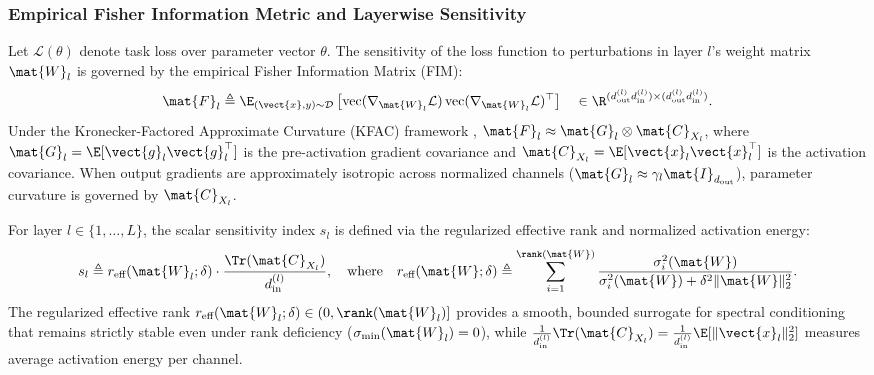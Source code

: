 \subsubsection{Empirical Fisher Information Metric and Layerwise Sensitivity}
Let $\mathcal{L}(\theta)$ denote task loss over parameter vector $\theta$. The sensitivity of the loss function to perturbations in layer $l$'s weight matrix $\mat{W}_l$ is governed by the empirical Fisher Information Matrix (FIM):
\begin{equation}
\mat{F}_l \triangleq \E_{(\vect{x}, y) \sim \mathcal{D}} \left[ \operatorname{vec}(\nabla_{\mat{W}_l} \mathcal{L}) \operatorname{vec}(\nabla_{\mat{W}_l} \mathcal{L})^\top \right] \quad \in \R^{(d_{\text{out}}^{(l)} d_{\text{in}}^{(l)}) \times (d_{\text{out}}^{(l)} d_{\text{in}}^{(l)})}.
\label{eq:fim_layerwise}
\end{equation}
Under the Kronecker-Factored Approximate Curvature (KFAC) framework \cite{martens2015optimizing}, $\mat{F}_l \approx \mat{G}_l \otimes \mat{C}_{X_l}$, where $\mat{G}_l = \E[\vect{g}_l \vect{g}_l^\top]$ is the pre-activation gradient covariance and $\mat{C}_{X_l} = \E[\vect{x}_l \vect{x}_l^\top]$ is the activation covariance. When output gradients are approximately isotropic across normalized channels ($\mat{G}_l \approx \gamma_l \mat{I}_{d_{\text{out}}}$), parameter curvature is governed by $\mat{C}_{X_l}$.

\begin{definition}
\label{def:layerwise_sensitivity}
For layer $l \in \{1, \dots, L\}$, the scalar sensitivity index $s_l$ is defined via the regularized effective rank and normalized activation energy:
\begin{equation}
s_l \triangleq r_{\text{eff}}(\mat{W}_l; \delta) \cdot \frac{\Tr(\mat{C}_{X_l})}{d_{\text{in}}^{(l)}}, \quad \text{where} \quad r_{\text{eff}}(\mat{W}; \delta) \triangleq \sum_{i=1}^{\rank(\mat{W})} \frac{\sigma_i^2(\mat{W})}{\sigma_i^2(\mat{W}) + \delta^2 \|\mat{W}\|_2^2}.
\label{eq:sensitivity_index}
\end{equation}
The regularized effective rank $r_{\text{eff}}(\mat{W}_l; \delta) \in (0, \rank(\mat{W}_l)]$ provides a smooth, bounded surrogate for spectral conditioning that remains strictly stable even under rank deficiency ($\sigma_{\min}(\mat{W}_l) = 0$), while $\frac{1}{d_{\text{in}}^{(l)}} \Tr(\mat{C}_{X_l}) = \frac{1}{d_{\text{in}}^{(l)}} \E[\|\vect{x}_l\|_2^2]$ measures average activation energy per channel.
\end{definition}

